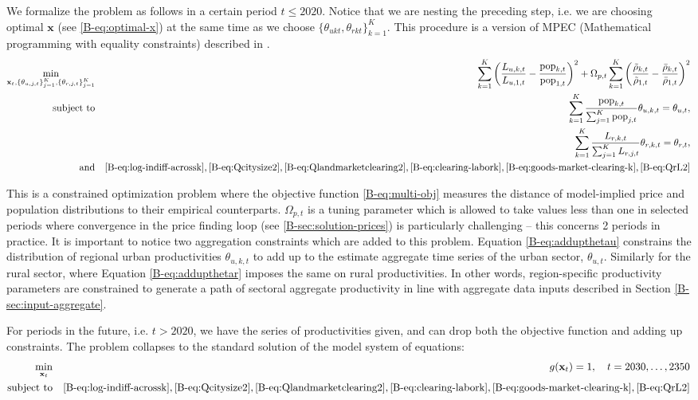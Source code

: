 \documentclass[11pt]{report}
\begin{document}
We formalize the problem as follows in a certain period $t \leq 2020$. Notice that we are nesting the preceding step, i.e. we are choosing optimal $\mathbf{x}$ (see \eqref{B-eq:optimal-x}) at the same time as we choose $\{\theta_{ukt},\theta_{rkt}\}_{k=1}^K$. This procedure is a version of MPEC (Mathematical programming with equality constraints) described in \cite{su2012constrained}.
\begin{eqnarray}
	\min_{\mathbf{x}_t,\left\{\theta_{u,j,t}\right\}_{j=1}^K,\left\{\theta_{r,j,t}\right\}_{j=1}^K} & & \sum_{k=1}^K \left(\frac{L_{u,k,t}}{L_{u,1,t}} - \frac{\text{pop}_{k,t}}{\text{pop}_{1,t}}\right)^2+ \Omega_{p,t} \sum_{k=1}^K \left(\frac{\tilde{\rho}_{k,t}}{\tilde{\rho}_{1,t}} - \frac{\bar{\rho}_{k,t}}{\bar{\rho}_{1,t}}\right)^2 
	\label{B-eq:multi-obj}\\
	\text{subject to}& &\sum_{k=1}^K  \frac{\text{pop}_{k,t}}{\sum_{j=1}^K\text{pop}_{j,t}} \theta_{u,k,t} = \theta_{u,t}, \label{B-eq:addupthetau}\\
	& & \sum_{k=1}^K  \frac{L_{r,k,t}}{\sum_{j=1}^K L_{r,j,t}} \theta_{r,k,t} = \theta_{r,t},\label{B-eq:addupthetar} \\
	\text{and}& & \eqref{B-eq:log-indiff-acrossk}, \eqref{B-eq:Qcitysize2}, \eqref{B-eq:Qlandmarketclearing2}, \eqref{B-eq:clearing-labork}, \eqref{B-eq:goods-market-clearing-k}, \eqref{B-eq:QrL2} \nonumber
\end{eqnarray}

This is a constrained optimization problem where the objective function \eqref{B-eq:multi-obj} measures the distance of model-implied price and population distributions to their empirical counterparts. $\Omega_{p,t}$ is a tuning parameter which is allowed to take values less than one in selected periods where convergence in the price finding loop (see \ref{B-sec:solution-prices}) is particularly challenging -- this concerns 2 periods in practice. It is important to notice two aggregation constraints which are added to this problem. Equation \eqref{B-eq:addupthetau} constrains the distribution of regional urban productivities $\theta_{u,k,t}$ to add up to the estimate aggregate time series of the urban sector, $\theta_{u,t}$. Similarly for the rural sector, where Equation \eqref{B-eq:addupthetar} imposes the same on rural productivities. In other words, region-specific productivity parameters are constrained to generate a path of sectoral aggregate productivity in line with aggregate data inputs described in Section \ref{B-sec:input-aggregate}. 

For periods in the future, i.e. $t > 2020$, we have the series of productivities given, and can drop both the objective function and adding up constraints. The problem collapses to the standard solution of the model system of equations:
\begin{eqnarray}
	\min_{\mathbf{x}_t} & & g(\mathbf{x}_t) = 1 , \quad t = 2030,\dots,2350 \label{B-eq:solve-system}\\
	\text{subject to}& & \eqref{B-eq:log-indiff-acrossk}, \eqref{B-eq:Qcitysize2}, \eqref{B-eq:Qlandmarketclearing2}, \eqref{B-eq:clearing-labork}, \eqref{B-eq:goods-market-clearing-k}, \eqref{B-eq:QrL2} \nonumber
\end{eqnarray}
\end{document}
